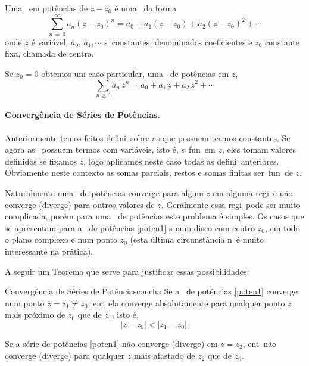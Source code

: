 Uma \ser\  em pot\^{e}ncias de $z-z_0$ \'e uma \ser\ da forma
\begin{equation}\label{poten1}
  \sum_{n\, =\, 0}^{\infty}a_n(z-z_0)^n=a_0+a_1(z-z_0)+a_2(z-z_0)^2+\cdots
\end{equation}
onde $z$ \'e  vari\'avel, $a_0$, $a_1, \cdots $ s\ao\ constantes,
denominados coeficientes e $z_0$ constante fixa, chamada de
centro.

Se $z_0=0$ obtemos um caso particular, uma \ser\ de pot\^{e}ncias em $z$,
\begin{equation}\label{poten2}
  \sum_{n\geq 0}a_n\,z^n=a_0+a_1\,z+a_2\,z^2+\cdots
\end{equation}

\paragraph{Converg\^encia de S\'eries de Pot\^{e}ncias.}
Anteriormente temos feitos defini\coes\ sobre as \sers que possuem
termos constantes. Se agora as \sers\ possuem termos com
vari\'aveis, isto \'{e}, s\ao\ fun\coes\ em $z$, eles tomam valores
definidos se fixamos $z$, logo aplicamos neste caso todas as
defini\coes\ anteriores. Obviamente neste contexto as somas
parciais, restos e somas finitas ser\ao\ fun\coes\ de $z$.

Naturalmente uma \ser\ de pot\^encias converge para algum $z$ em
alguma regi\ao\ e n\~{a}o converge (diverge) para outros valores de
$z$. Geralmente essa regi\ao\ pode ser muito complicada, por\'em
para uma \ser\ de pot\^{e}ncias este problema \'e simples. Os casos
que se apresentam para a \ser\ de pot\^{e}ncias \eqref{poten1} s\ao\:
num disco com centro $z_0$, em todo o plano complexo e num ponto
$z_0$ (esta \'{u}ltima circunst\^ancia n\ao\ \'e muito interessante na
pr\'{a}tica).

A seguir um Teorema que serve para justificar essas
possibilidades;

\begin{theoc}{Converg\^encia de Séries de Potências}{concha}
Se a \ser\ de pot\^{e}ncias \eqref{poten1} converge num ponto
$z=z_1\neq z_0$, ent\ao\ ela converge absolutamente para qualquer
ponto $z$ mais pr\'{o}ximo de $z_0$ que de $z_1$, isto \'e,
\begin{equation*}
  |z-z_0|<|z_1-z_0|.
\end{equation*}

Se a s\'{e}rie de pot\^{e}ncias \eqref{poten1} n\~{a}o converge (diverge) em
$z=z_2$, ent\ao\ n\~{a}o converge (diverge) para qualquer $z$ mais
afastado de $z_2$ que de $z_0$.
\end{theoc}

